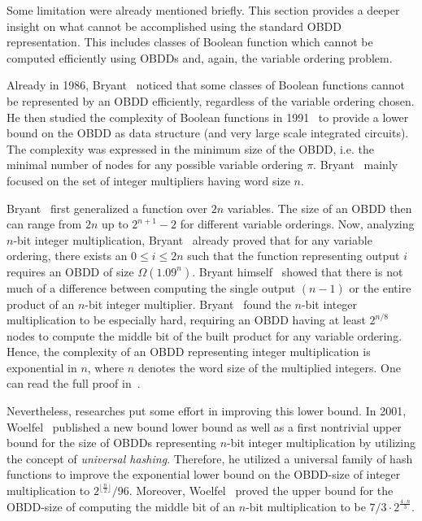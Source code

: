\documentclass{vldb}
\begin{document}
Some limitation were already mentioned briefly. This section provides a deeper
insight on what cannot be accomplished using the standard OBDD representation.
This includes classes of Boolean function which cannot be computed efficiently
using OBDDs and, again, the variable ordering problem.

Already in 1986, Bryant~\cite{BRYANT86} noticed that some classes of Boolean
functions cannot be represented by an OBDD efficiently, regardless of the variable
ordering chosen. He then studied the complexity of Boolean functions in
1991~\cite{BRYANT91} to provide a lower bound on the OBDD as data structure (and
very large scale integrated circuits). The complexity was expressed in the minimum
size of the OBDD, i.e. the minimal number of nodes for any possible variable
ordering $\pi$. Bryant~\cite{BRYANT91} mainly focused on the set of integer
multipliers having word size $n$.

Bryant~\cite{BRYANT91} first generalized a function over $2n$ variables. The size
of an OBDD then can range from $2n$ up to $2^{n+1}-2$ for different variable
orderings. Now, analyzing $n$-bit integer multiplication, Bryant~\cite{BRYANT86}
already proved that for any variable ordering, there exists an $0 \le i \le 2n$
such that the function representing output $i$ requires an OBDD of size
$\Omega(1.09^n)$. Bryant himself~\cite{BRYANT91} showed that there is not much
of a difference between computing the single output $(n-1)$ or the entire product
of an $n$-bit integer multiplier. Bryant~\cite{BRYANT91} found the $n$-bit integer
multiplication to be especially hard, requiring an OBDD having at least $2^{n/8}$
nodes to compute the middle bit of the built product for any variable ordering.
Hence, the complexity of an OBDD representing integer multiplication is
exponential in $n$, where $n$ denotes the word size of the multiplied integers.
One can read the full proof in~\cite{BRYANT91}.

Nevertheless, researches put some effort in improving this lower bound. In 2001,
Woelfel~\cite{WOELFEL01} published a new bound lower bound as well as a first 
nontrivial upper bound for the size of OBDDs representing $n$-bit integer
multiplication by utilizing the concept of \textit{universal hashing}. Therefore,
he utilized a universal family of hash functions to improve the exponential lower
bound on the OBDD-size of integer multiplication to
$2^{\lfloor\frac{n}{2}\rfloor}/96$. Moreover, Woelfel~\cite{WOELFEL01} proved
the upper bound for the OBDD-size of computing the middle bit of an $n$-bit
multiplication to be $7/3 \cdot 2^{\frac{4 \cdot n}{3}}$.
\end{document}
